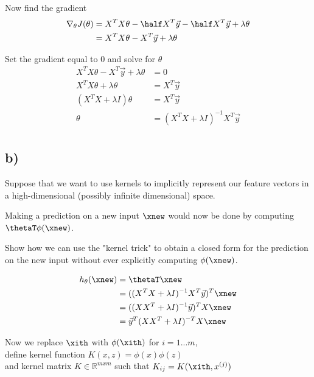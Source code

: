 \documentclass[11pt]{article}
\begin{document}
Now find the gradient
\begin{align*}
  \nabla_{\theta} J(\theta) &= X^{T} X \theta - \half X^{T} \vec{y} - \half X^{T} \vec{y} + \lambda \theta \\
  &= X^{T} X \theta - X^{T} \vec{y} + \lambda \theta \\
\end{align*}

Set the gradient equal to $0$ and solve for $\theta$
\begin{align*}
  X^{T} X \theta - X^{T} \vec{y} + \lambda \theta &= 0 \\
  X^{T} X \theta + \lambda \theta &= X^{T} \vec{y} \\
  (X^{T} X + \lambda I) \theta &= X^{T} \vec{y} \\
  \theta &= (X^{T} X + \lambda I)^{-1} X^{T} \vec{y} \\
\end{align*}

\subsection*{b)}

Suppose that we want to use kernels to implicitly represent our feature vectors in a high-dimensional (possibly infinite dimensional) space. 

Making a prediction on a new input $\xnew$ would now be done by computing $\thetaT \phi(\xnew)$.

Show how we can use the "kernel trick" to obtain a closed form for the prediction on the new input without ever explicitly computing $\phi(\xnew)$.

\begin{align*}
  h_{\theta}(\xnew) &= \thetaT \xnew \\
             &= ((X^{T} X + \lambda I)^{-1} X^{T} \vec{y})^{T} \xnew \\
             &= ((X X^{T} + \lambda I)^{-1} \vec{y})^{T} X \xnew \\
             &= \vec{y}^{T} (X X^{T} + \lambda I)^{-T} X \xnew \\
\end{align*}

Now we replace $\xith$ with $\phi(\xith)$ for $i = 1...m$,\\
define kernel function $K(x, z) = \phi(x) \phi(z)$ \\
and kernel matrix $K \in \mathbb{R}^{m x m}$ such that $K_{ij} = K(\xith, x^{(j)})$
\end{document}
